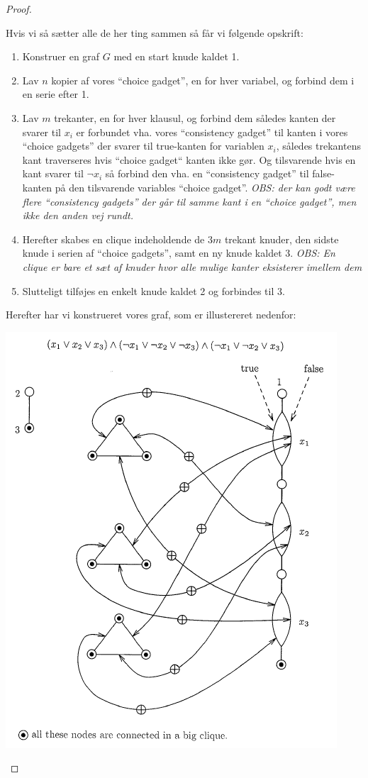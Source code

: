 \begin{proof}
\begin{center}
\end{center}
Hvis vi så sætter alle de her ting sammen så får vi følgende opskrift:\\
\begin{enumerate}
 \item Konstruer en graf $G$ med en start knude kaldet 1.
 \item Lav $n$ kopier af vores ``choice gadget'', en for hver variabel, og forbind dem i en serie efter 1.
 \item Lav $m$ trekanter, en for hver klausul, og forbind dem således kanten der svarer til $x_i$ er forbundet vha. vores ``consistency gadget'' til kanten i vores ``choice gadgets'' der svarer til true-kanten for variablen $x_i$, således trekantens kant traverseres hvis ``choice gadget`` kanten ikke gør. Og tilsvarende hvis en kant svarer til $\neg x_i$ så forbind den vha. en ``consistency gadget'' til false-kanten på den tilsvarende variables ``choice gadget''. \textit{OBS: der kan godt være flere ``consistency gadgets'' der går til samme kant i en ``choice gadget'', men ikke den anden vej rundt.}
 \item Herefter skabes en clique indeholdende de $3m$ trekant knuder, den sidste knude i serien af ``choice gadgets'', samt en ny knude kaldet 3. \textit{OBS: En clique er bare et sæt af knuder hvor alle mulige kanter eksisterer imellem dem}
 \item Slutteligt tilføjes en enkelt knude kaldet 2 og forbindes til 3.
\end{enumerate}
Herefter har vi konstrueret vores graf, som er illustereret nedenfor:
\begin{center}
 \includegraphics[bb=0 0 350 440]{./hamiltonPath.png}

\end{center}
\end{proof}
